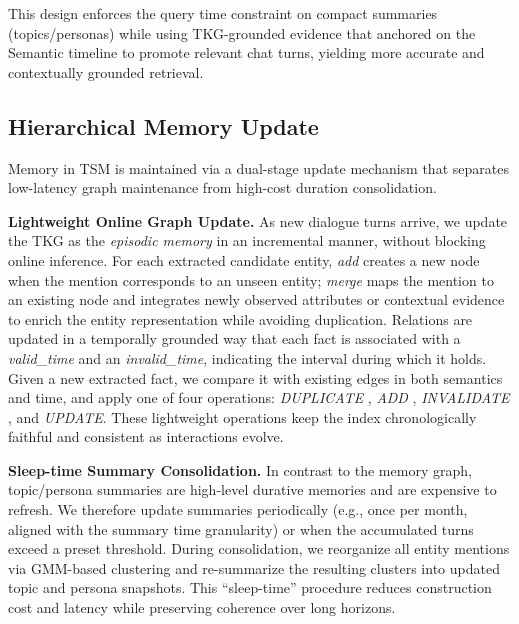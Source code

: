 \documentclass[11pt]{article}
\newcommand{\ours}[1]{TSM}
\begin{document}
This design enforces the query time constraint on compact summaries (topics/personas) while using TKG-grounded evidence that anchored on the Semantic timeline to promote relevant chat turns, yielding more accurate and contextually grounded retrieval.



\subsection{Hierarchical Memory Update}
\label{sec:update}

Memory in \ours{} is maintained via a dual-stage update mechanism that separates low-latency graph maintenance from high-cost duration consolidation.

\noindent \textbf{Lightweight Online Graph Update.}
As new dialogue turns arrive, we update the TKG as the \emph{episodic memory} in an incremental manner, without blocking online inference. 
For each extracted candidate entity, \textit{add} creates a new node when the mention corresponds to an unseen entity; \textit{merge} maps the mention to an existing node and integrates newly observed attributes or contextual evidence to enrich the entity representation while avoiding duplication. 
Relations are updated in a temporally grounded way that each fact is associated with a \textit{valid\_time} and an \textit{invalid\_time}, indicating the interval during which it holds. 
Given a new extracted fact, we compare it with existing edges in both semantics and time, and apply one of four operations: \textit{DUPLICATE}%
, \textit{ADD}%
, \textit{INVALIDATE}%
, and \textit{UPDATE}. %
These lightweight operations keep the index chronologically faithful and consistent as interactions evolve.

\noindent \textbf{Sleep-time Summary Consolidation.}
In contrast to the memory graph, topic/persona summaries are high-level durative memories and are expensive to refresh. 
We therefore update summaries periodically (e.g., once per month, aligned with the summary time granularity) or when the accumulated turns exceed a preset threshold. 
During consolidation, we reorganize all entity mentions via GMM-based clustering and re-summarize the resulting clusters into updated topic and persona snapshots. 
This ``sleep-time'' procedure reduces construction cost and latency while preserving coherence over long horizons.
\end{document}
